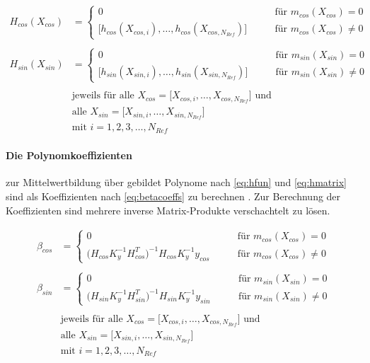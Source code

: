 \begin{align}\label{eq:hmatrix}
	H_{cos}(X_{cos}) &=
		\begin{cases}
			0 															   &\qquad \text{für } m_{cos}(X_{cos}) = 0 \\
			\big[ h_{cos}(X_{cos,i}),\ldots,h_{cos}(X_{cos,N_{Ref}}) \big] &\qquad \text{für } m_{cos}(X_{cos}) \ne 0
		\end{cases} \nonumber \\
	\\
	H_{sin}(X_{sin}) &=
		\begin{cases}
			0															   &\qquad \text{für } m_{sin}(X_{sin}) = 0 \\
			\big[ h_{sin}(X_{sin,i}),\ldots,h_{sin}(X_{sin,N_{Ref}}) \big] &\qquad \text{für } m_{sin}(X_{sin}) \ne 0
		\end{cases} \nonumber \\
	\nonumber \\
	& \text{jeweils für alle } X_{cos} = \big[ X_{cos,i},\dots, X_{cos,N_{Ref}} \big] \text{ und } \nonumber \\
	& \text{alle } X_{sin} = \big[ X_{sin,i},\dots, X_{sin,N_{Ref}} \big] \nonumber \\
	& \text{mit } i = 1,2,3,\ldots,N_{Ref} \nonumber
\end{align}



\paragraph*{Die Polynomkoeffizienten} zur Mittelwertbildung über gebildet Polynome nach \autoref{eq:hfun} und \autoref{eq:hmatrix} sind als Koeffizienten nach \autoref{eq:betacoeffs} zu berechnen \cite{Rasmussen2006}. Zur Berechnung der Koeffizienten sind mehrere inverse Matrix-Produkte verschachtelt zu lösen. 


\clearpage


\begin{align}\label{eq:betacoeffs}
	\beta_{cos} &= 
		\begin{cases}
			0 																	 &\qquad \text{für } m_{cos}(X_{cos}) = 0\\
			\big( H_{cos} K_y^{-1} H_{cos}^T \big)^{-1} H_{cos} K_y^{-1} y_{cos} &\qquad \text{für } m_{cos}(X_{cos}) \ne 0
		\end{cases} \nonumber \\
	\\
	\beta_{sin} &= 
		\begin{cases}
			0 																	 &\qquad \text{für } m_{sin}(X_{sin}) = 0\\
			\big( H_{sin} K_y^{-1} H_{sin}^T \big)^{-1} H_{sin} K_y^{-1} y_{sin} &\qquad \text{für } m_{sin}(X_{sin}) \ne 0
		\end{cases} \nonumber \\
	\nonumber \\
	& \text{jeweils für alle } X_{cos} = \big[ X_{cos,i},\dots, X_{cos,N_{Ref}} \big] \text{ und } \nonumber \\
	& \text{alle } X_{sin} = \big[ X_{sin,i},\dots, X_{sin,N_{Ref}} \big] \nonumber \\
	& \text{mit } i = 1,2,3,\ldots,N_{Ref} \nonumber
\end{align}


